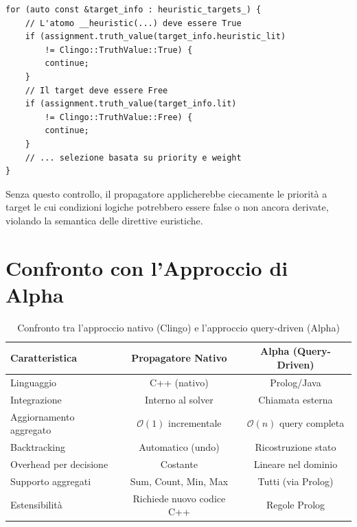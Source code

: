 \documentclass[a4paper,12pt,twoside,openright]{report}
\begin{document}
\begin{lstlisting}[style=cppstyle,caption={Verifica della condizione nel metodo \texttt{decide}}]
for (auto const &target_info : heuristic_targets_) {
    // L'atomo __heuristic(...) deve essere True
    if (assignment.truth_value(target_info.heuristic_lit)
        != Clingo::TruthValue::True) {
        continue;
    }
    // Il target deve essere Free
    if (assignment.truth_value(target_info.lit)
        != Clingo::TruthValue::Free) {
        continue;
    }
    // ... selezione basata su priority e weight
}
\end{lstlisting}

Senza questo controllo, il propagatore applicherebbe ciecamente le priorit\`{a} a target le cui condizioni logiche potrebbero essere false o non ancora derivate, violando la semantica delle direttive euristiche.

\section{Confronto con l'Approccio di Alpha}

\begin{table}[H]
    \centering
    \caption{Confronto tra l'approccio nativo (Clingo) e l'approccio query-driven (Alpha)}
    \label{tab:confronto_alpha}
    \begin{tabular}{lcc}
        \toprule
        \textbf{Caratteristica} & \textbf{Propagatore Nativo} & \textbf{Alpha (Query-Driven)} \\
        \midrule
        Linguaggio               & C++ (nativo)        & Prolog/Java \\
        Integrazione             & Interno al solver   & Chiamata esterna \\
        Aggiornamento aggregato  & $\mathcal{O}(1)$ incrementale   & $\mathcal{O}(n)$ query completa \\
        Backtracking             & Automatico (undo)   & Ricostruzione stato \\
        Overhead per decisione   & Costante            & Lineare nel dominio \\
        Supporto aggregati       & Sum, Count, Min, Max & Tutti (via Prolog) \\
        Estensibilit\`{a}        & Richiede nuovo codice C++ & Regole Prolog \\
        \bottomrule
    \end{tabular}
\end{table}
\end{document}
